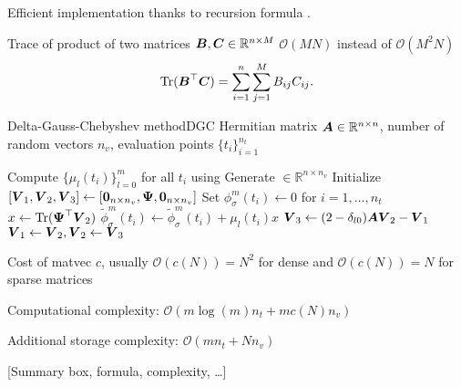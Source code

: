 Efficient implementation thanks to recursion formula .

Trace of product of two matrices $\boldsymbol{B}, \boldsymbol{C} \in \mathbb{R}^{n \times M}$
$\mathcal{O}(MN)$ instead of $\mathcal{O}(M^2N)$
\begin{equation}
    \operatorname{Tr}(\boldsymbol{B}^{\top}\boldsymbol{C}) = \sum_{i=1}^{n} \sum_{j=1}^{M} B_{ij} C_{ij}.
    \label{equ:2-chebyshev-fast-trace}
\end{equation}

\begin{algo}{Delta-Gauss-Chebyshev method}{DGC}
    Hermitian matrix $\boldsymbol{A} \in \mathbb{R}^{n \times n}$, number of random vectors $n_v$,
    evaluation points $\{t_i\}_{i=1}^{n_t}$
    \begin{algorithmic}[1]
        \State Compute $\{\mu_l(t_i)\}_{l=0}^m$ for all $t_i$ using 
        \State Generate  $\in \mathbb{R}^{n \times n_v}$
        \State Initialize $[\boldsymbol{V}_1, \boldsymbol{V}_2, \boldsymbol{V}_3] \gets [\boldsymbol{0}_{n \times n_v}, \boldsymbol{\Psi}, \boldsymbol{0}_{n \times n_v}]$
        \State Set ${\phi}_{\sigma}^m(t_i) \gets 0$ for $i=1,\dots,n_t$
          \State $x \gets \operatorname{Tr}(\boldsymbol{\Psi}^{\top} \boldsymbol{V}_2)$
            \State $\widetilde{\phi}_{\sigma}^m(t_i) \gets \widetilde{\phi}_{\sigma}^m(t_i) + \mu_l(t_i) x$
          \EndFor
          \State $\boldsymbol{V}_3 \gets (2 - \delta_{l0}) \boldsymbol{A} \boldsymbol{V}_2 - \boldsymbol{V}_1$ 
          \State $\boldsymbol{V}_1 \gets \boldsymbol{V}_2, \boldsymbol{V}_2 \gets \boldsymbol{V}_3$
        \EndFor
    \end{algorithmic}
\end{algo}

Cost of matvec $c$, usually $\mathcal{O}(c(N)) = N^2$ for dense and
$\mathcal{O}(c(N)) = N$ for sparse matrices

Computational complexity: $\mathcal{O}(m \log(m) n_t + m c(N) n_v)$

Additional storage complexity: $\mathcal{O}(m n_t + N n_v)$

[Summary box, formula, complexity, \dots]